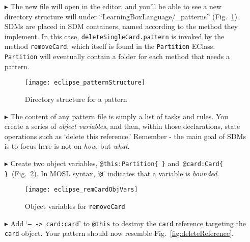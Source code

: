 \begin{itemize}
\newpage

\item[$\blacktriangleright$] The new file will open in the editor, and you'll be able to see a new directory structure will under
``LearningBoxLanguage/\_patterns'' (Fig.~\ref{fig:pattStruct}). SDMs are placed in SDM containers, named according to the method they implement. In this case,
\texttt{deleteSingleCard.pattern} is invoked by the method \texttt{removeCard}, which itself is found in the \texttt{Partition} EClass. \texttt{Partition} will
eventually contain a folder for each method that needs a pattern.

\vspace{0.5cm}

\begin{figure}[htp]
\begin{center}
  \texttt{[image: eclipse\_patternStructure]}
  \caption{Directory structure for a pattern}
  \label{fig:pattStruct}
\end{center}
\end{figure}

\item[$\blacktriangleright$] The content of any pattern file is simply a list of tasks and rules. You create a series of \emph{object variables}, and then,
within those declarations, state operations such as `delete this reference.' Remember - the main goal of SDMs is to focus here is not on \emph{how}, but
\emph{what}.

\vspace{0.5cm}

\item[$\blacktriangleright$] Create two object variables, \texttt{@this:Partition\{ \}} and~\texttt{@card:Card\{ \}}~(Fig.~\ref{fig:remCardObjVar}). In MOSL
syntax, `\texttt{@}' indicates that a variable is \emph{bounded}.

\begin{figure}[htp]
\begin{center}
  \texttt{[image: eclipse\_remCardObjVars]}
  \caption{Object variables for \texttt{removeCard}}
  \label{fig:remCardObjVar}
\end{center}
\end{figure}

\clearpage

\item[$\blacktriangleright$] Add `\texttt{-- -> card:card}' to \texttt{@this} to destroy the \texttt{card} reference targeting the \texttt{card} object.
Your pattern should now resemble Fig.~\ref{fig:deleteReference}.


\end{itemize}
